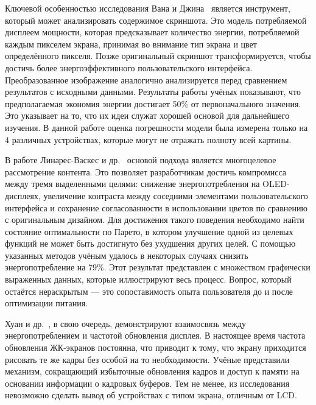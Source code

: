 \documentclass[a4paper,14pt]{extarticle} %
\begin{document}
	Ключевой особенностью исследования Вана и Джина~\parencite{wan2015detecting} является инструмент, который может анализировать содержимое скриншота. Это модель потребляемой дисплеем мощности, которая предсказывает количество энергии, потребляемой каждым пикселем экрана, принимая во внимание тип экрана и цвет определённого пикселя. Позже оригинальный скриншот трансформируется, чтобы достичь более энергоэффективного пользовательского интерфейса. Преобразованное изображение аналогично анализируется перед сравнением результатов с исходными данными. Результаты работы учёных показывают, что предполагаемая экономия энергии достигает 50\% от первоначального значения. Это указывает на то, что их идеи служат хорошей основой для дальнейшего изучения. В данной работе оценка погрешности модели была измерена только на 4 различных устройствах, которые могут не отражать полноту всей картины.
	
	В работе Линарес-Васкес и др.~\parencite{linares2018multi} основой подхода является многоцелевое рассмотрение контента. Это позволяет разработчикам достичь компромисса между тремя выделенными целями: снижение энергопотребления на OLED-дисплеях, увеличение контраста между соседними элементами пользовательского интерфейса и сохранение согласованности в использовании цветов по сравнению с оригинальным дизайном. Для достижения такого поведения необходимо найти состояние оптимальности по Парето, в котором улучшение одной из целевых функций не может быть достигнуто без ухудшения других целей. С помощью указанных методов учёным удалось в некоторых случаях снизить энергопотребление на 79\%. Этот результат представлен с множеством графически выраженных данных, которые иллюстрируют весь процесс. Вопрос, который остаётся нераскрытым --- это сопоставимость опыта пользователя до и после оптимизации питания.
	
	Хуан и др.~\parencite{huang2014intelligent}, в свою очередь, демонстрируют взаимосвязь между энергопотреблением и частотой обновления дисплея. В настоящее время частота обновления ЖК-экранов постоянна, что приводит к тому, что экрану приходится рисовать те же кадры без особой на то необходимости. Учёные представили механизм, сокращающий избыточные обновления кадров и доступ к памяти на основании информации о кадровых буферов. Тем не менее, из исследования невозможно сделать вывод об устройствах с типом экрана, отличным от LCD.
	
\end{document}
